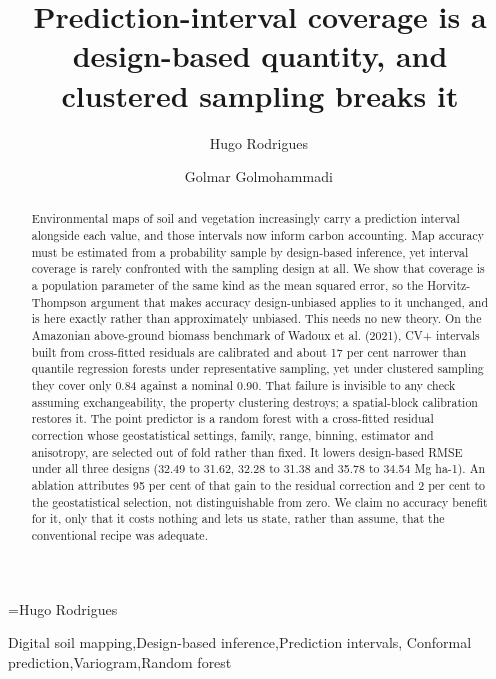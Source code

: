 \documentclass[preprint,12pt,authoryear]{elsarticle}
\begin{document}
\begin{frontmatter}

\title{Prediction-interval coverage is a design-based quantity, and
clustered sampling breaks it}

\author[uf]{Hugo Rodrigues\,}
\makeatletter\@eadauthor={Hugo Rodrigues}\makeatother
{}

\author[uf]{Golmar Golmohammadi\,}

\address[uf]{University of Florida, Range Cattle Research and Education
Center, 3401 Experiment Station, Ona, FL 33865, USA}


\begin{abstract}
Environmental maps of soil and vegetation increasingly carry a prediction
interval alongside each value, and those intervals now inform carbon accounting. Map accuracy must be estimated from a probability sample by
design-based inference, yet interval coverage is rarely confronted with the
sampling design at all. We show that coverage is a
population parameter of the same kind as the mean squared error, so the
Horvitz-Thompson argument that makes accuracy design-unbiased applies to it
unchanged, and is here exactly rather than approximately unbiased. This needs no
new theory. On the Amazonian above-ground biomass
benchmark of Wadoux et al. (2021), CV+ intervals built from cross-fitted
residuals are calibrated and about 17 per cent narrower than quantile regression
forests under representative sampling, yet under clustered sampling they cover
only 0.84 against a nominal 0.90. That failure is invisible to any check
assuming exchangeability, the property clustering destroys; a spatial-block
calibration restores it. The point predictor is a
random forest with a cross-fitted residual correction whose geostatistical
settings, family, range, binning, estimator and anisotropy, are selected out of
fold rather than fixed. It lowers design-based RMSE under all
three designs (32.49 to 31.62, 32.28 to 31.38 and 35.78 to 34.54 Mg ha-1). An
ablation attributes 95 per cent of that gain to the residual correction and 2
per cent to the geostatistical selection, not distinguishable from zero. We
claim no accuracy benefit for it, only that it costs nothing and lets us state,
rather than assume, that the conventional recipe was adequate.
\end{abstract}

\begin{keyword}
Digital soil mapping\sep Design-based inference\sep Prediction intervals\sep
Conformal prediction\sep Variogram\sep Random forest
\end{keyword}

\end{frontmatter}
\end{document}
